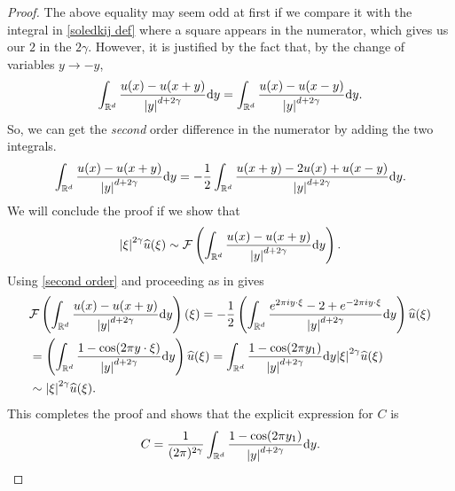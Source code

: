 \documentclass[
    a4paper,
    DIV=14,
    abstract=true,
    numbers=noenddot
]{scrartcl}
\begin{document}
\begin{proof}
    The above equality may seem odd at first if we compare it with the integral in \ref{soledkij def} where a square appears in the numerator, which gives us our $2$  in the $2 \gamma $. However, it is justified by the fact that, by the change of variables $y \to -y$,
    \begin{align*}
        \int_{\mathbb{R}^d}\frac{u(x)-u(x+y)}{{\left| y \right|}^{d+2\gamma}}\mathrm{d} y=\int_{\mathbb{R}^d}\frac{u(x)-u(x-y)}{{\left| y \right|}^{d+2\gamma}}\mathrm{d} y.
    \end{align*}
    So, we can get the \emph{second} order difference in the numerator by adding the two integrals.
    \begin{align}\label{second order}
        \int_{\mathbb{R}^d}\frac{u(x)-u(x+y)}{{\left| y \right|}^{d+2\gamma}}\mathrm{d} y=-\frac{1}{2}\int_{\mathbb{R}^d}\frac{u(x+y)-2u(x)+u(x-y)}{{\left| y \right|}^{d+2\gamma}}\mathrm{d} y.
    \end{align}
    We will conclude the proof if we show that
    \begin{align*}
        {\left| \xi \right|}^{2\gamma }\widehat{u}(\xi )\sim \mathcal{F} \left(\int_{\mathbb{R}^d}\frac{u(x)-u(x+y)}{{\left| y \right|}^{d+2\gamma}}\mathrm{d} y\right).
    \end{align*}
    Using \eqref{second order} and proceeding as in  gives
    \begin{align*}
         & \mathcal{F} \left(\int_{\mathbb{R}^d}\frac{u(x)-u(x+y)}{{\left| y \right|}^{d+2\gamma}}\mathrm{d} y\right)(\xi)= -\frac{1}{2} \left(\int_{\mathbb{R}^d}\frac{e^{2\pi i y \cdot \xi}-2+e^{-2\pi i y \cdot \xi}}{{\left| y \right|}^{d+2\gamma}}\mathrm{d} y\right) \widehat{u}(\xi)       \\
         & =\left(\int_{\mathbb{R}^d}\frac{1-\cos(2\pi y \cdot \xi)}{{\left| y \right|}^{d+2\gamma}}\mathrm{d} y\right) \widehat{u}(\xi) =\int_{\mathbb{R}^d}  \frac{1-\cos(2\pi  y_1) }{{\left| y \right|}^{d+2\gamma	}}\mathrm{d} y{\left| \xi \right|}^{2 \gamma }\widehat{u}(\xi) \\& \sim {\left| \xi \right|}^{2 \gamma }\widehat{u}(\xi).
    \end{align*}
    This completes the proof and shows that the explicit expression for $C$ is
    \begin{align*}
        C=\frac{1}{(2\pi)^{2 \gamma }}\int_{\mathbb{R}^d}  \frac{1-\cos(2\pi  y_1) }{{\left| y \right|}^{d+2\gamma	}}\mathrm{d} y.
    \end{align*}
\end{proof}
\end{document}

